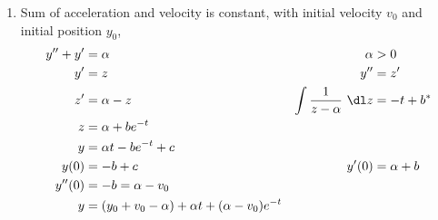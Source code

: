 \begin{enumerate}
    \item Sum of acceleration and velocity is constant, with initial velocity
          $ v_{0} $ and initial position $ y_{0} $,
          \begin{align}
              y'' + y'                        & = \alpha                     &
              \alpha                          & > 0                            \\
              y'                              & = z                          &
              y''                             & = z'                           \\
              z'                              & = \alpha - z                 &
              \int\frac{1}{z - \alpha}\ \dl z & = -t + b^{*}                   \\
              z                               & = \alpha + be^{-t}             \\
              y                               & = \alpha t - be^{-t}  + c      \\
              y(0)                            & = -b + c                     &
              y'(0)                           & = \alpha + b                   \\
              y''(0)                          & = -b = \alpha - v_{0}          \\
              y                               & = (y_{0} + v_{0} - \alpha) +
              \alpha t + (\alpha - v_{0})
              e^{-t}
          \end{align}
          \begin{figure}[H]
              \centering
          \end{figure}


\end{enumerate}
